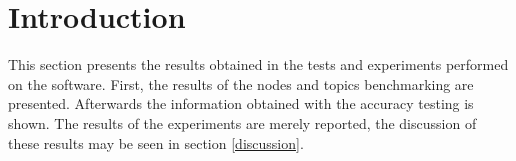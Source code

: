 \section{Introduction}

This section presents the results obtained in the tests and experiments performed on the software. 
First, the results of the nodes and topics benchmarking are presented. 
Afterwards the information obtained with the accuracy testing is shown. 
The results of the experiments are merely reported, the discussion of these results may be seen in section \ref{discussion}.